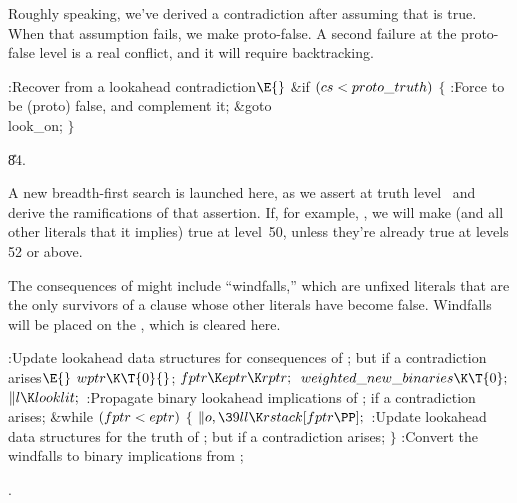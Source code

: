 Roughly speaking, we've derived a contradiction after assuming
that  is true. When that assumption fails, we make
 proto-false. A second failure at the proto-false level
is a real conflict, and it will require backtracking.

\Y\B\4:Recover from a lookahead contradiction\X${}\E{}$\6
\&{if} ${}(\\{cs}<\\{proto\_truth}){}$\5
${}\{{}$\1\6
:Force  to be (proto) false, and complement it\X;\6
\&{goto} \\{look\_on};\6
\4${}\}{}$\2\par
\U84.\fi

A new breadth-first search is launched here, as we assert %
at truth level~ and derive the ramifications of that assertion.
If, for example, , we will make  (and all
other literals
that it implies) true at level~50, unless they're already true at
levels 52 or above.

The consequences of  might include ``windfalls,'' which
are unfixed literals that are the only survivors of a clause whose
other literals have become false. Windfalls will be placed on the
, which is cleared here.

\Y\B\4:Update lookahead data structures for consequences of ; but  if a contradiction arises\X${}\E{}$\6
$\\{wptr}\K\T{0}{}$;\5
${}\\{fptr}\K\\{eptr}\K\\{rptr};{}$\6
${}\\{weighted\_new\_binaries}\K\T{0};{}$\6
${}\|l\K\\{looklit};{}$\6
:Propagate binary lookahead implications of ;  if a contradiction arises\X;\6
\&{while} ${}(\\{fptr}<\\{eptr}){}$\5
${}\{{}$\1\6
${}\|o,\39\\{ll}\K\\{rstack}[\\{fptr}\PP];{}$\6
:Update lookahead data structures for the truth of ; but  if a contradiction arises\X;\6
\4${}\}{}$\2\6
:Convert the windfalls to binary implications from \X;\par
{}.\fi

